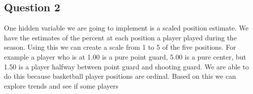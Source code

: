 \documentclass[12pt, letterpaper, titlepage]{article}
\begin{document}
\subsection{Question 2}
One hidden variable we are going to implement is a scaled position estimate. We
have the estimates of the percent at each position a player played during the
season.  Using this we can create a scale from 1 to 5 of the five positions.  For
example a player who is at 1.00 is a pure point guard, 5.00 is a pure center,
but 1.50 is a player halfway between point guard and shooting guard.  We are able
to do this because basketball player positions are ordinal.  Based on this we
can explore trends and see if some players 
\end{document}
